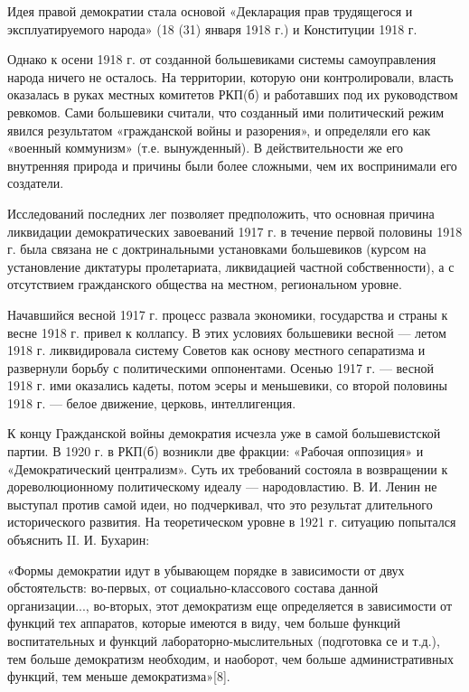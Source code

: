 \documentclass{article}
\begin{document}
Идея правой демократии стала основой «Декларация прав трудящегося и эксплуатируемого народа» (18 (31) января 1918 г.) и Конституции 1918 г.

\hfill

Однако к осени 1918 г. от созданной большевиками системы самоуправления народа ничего не осталось. На территории, которую они контролировали, власть оказалась в руках местных комитетов РКП(б) и работавших под их руководством ревкомов. Сами большевики считали, что созданный ими политический режим явился результатом «гражданской войны и разорения», и определяли его как «военный коммунизм» (т.е. вынужденный). В действительности же его внутренняя природа и причины были более сложными, чем их воспринимали его создатели.

\hfill

Исследований последних лег позволяет предположить, что основная причина ликвидации демократических завоеваний 1917 г. в течение первой половины 1918 г. была связана не с доктринальными установками большевиков (курсом на установление диктатуры пролетариата, ликвидацией частной собственности), а с отсутствием гражданского общества на местном, региональном уровне.

\hfill

Начавшийся весной 1917 г. процесс развала экономики, государства и страны к весне 1918 г. привел к коллапсу. В этих условиях большевики весной — летом 1918 г. ликвидировала систему Советов как основу местного сепаратизма и развернули борьбу с политическими оппонентами. Осенью 1917 г. — весной 1918 г. ими оказались кадеты, потом эсеры и меньшевики, со второй половины 1918 г. — белое движение, церковь, интеллигенция.

\hfill

К концу Гражданской войны демократия исчезла уже в самой большевистской партии. В 1920 г. в РКП(б) возникли две фракции: «Рабочая оппозиция» и «Демократический централизм». Суть их требований состояла в возвращении к дореволюционному политическому идеалу — народовластию. В. И. Ленин не выступал против самой идеи, но подчеркивал, что это результат длительного исторического развития. На теоретическом уровне в 1921 г. ситуацию попытался объяснить II. И. Бухарин:

«Формы демократии идут в убывающем порядке в зависимости от двух обстоятельств: во-первых, от социально-классового состава данной организации..., во-вторых, этот демократизм еще определяется в зависимости от функций тех аппаратов, которые имеются в виду, чем больше функций воспитательных и функций лабораторно-мыслительных (подготовка се и т.д.), тем больше демократизм необходим, и наоборот, чем больше административных функций, тем меньше демократизма»[8].
\end{document}
